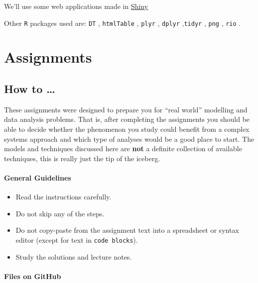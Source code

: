 \documentclass[]{book}
\providecommand{\tightlist}{%
  \setlength{\itemsep}{0pt}\setlength{\parskip}{0pt}}
\begin{document}
We'll use some web applications made in
\href{http://shiny.rstudio.com}{Shiny} \citep{R-shiny}

Other \texttt{R} packages used are: \texttt{DT} \citep{R-DT},
\texttt{htmlTable} \citep{R-htmlTable}, \texttt{plyr} \citep{R-plyr},
\texttt{dplyr} \citep{R-dplyr},\texttt{tidyr} \citep{R-tidyr},
\texttt{png} \citep{R-png}, \texttt{rio} \citep{R-rio}.

\part{Assignments}\label{part-assignments}

\chapter*{\texorpdfstring{\textbf{How to \ldots{}
}}{How to \ldots{} }}\label{how-to}

These assignments were designed to prepare you for ``real world''
modelling and data analysis problems. That is, after completing the
assignments you should be able to decide whether the phenomenon you
study could benefit from a complex systems approach and which type of
analyses would be a good place to start. The models and techniques
discussed here are \textbf{not} a definite collection of available
techniques, this is really just the tip of the iceberg.

\subsection*{General Guidelines}\label{general-guidelines}

\begin{itemize}
\tightlist
\item
  Read the instructions carefully.
\item
  Do not skip any of the steps.
\item
  Do not copy-paste from the assignment text into a spreadsheet or
  syntax editor (except for text in \texttt{code\ blocks}).
\item
  Study the solutions and lecture notes.
\end{itemize}

\subsection*{Files on GitHub}\label{files-on-github}
\end{document}
